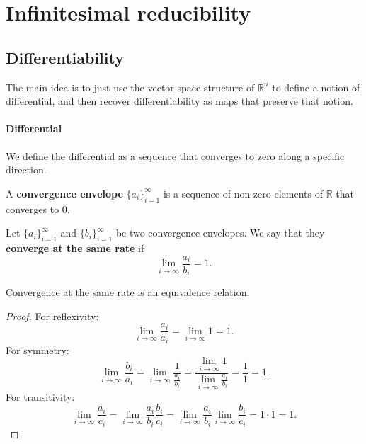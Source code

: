 \documentclass[11pt,letterpaper,fleqn]{memoir}
\begin{document}
	
\tableofcontents* 
	
\cleardoublepage 
\mainmatter

\chapter{Infinitesimal reducibility}

\section{Differentiability}

The main idea is to just use the vector space structure of $\mathbb{R}^n$ to define a notion of differential, and then recover differentiability as maps that preserve that notion.

\subsubsection{Differential}

We define the differential as a sequence that converges to zero along a specific direction.

\begin{defn}
	A \textbf{convergence envelope} $\{a_i\}_{i=1}^{\infty}$ is a sequence of non-zero elements of $\mathbb{R}$ that converges to $0$.
\end{defn}

\iffalse

\begin{defn}
	Let $\{a_i\}_{i=1}^{\infty}$ and $\{b_i\}_{i=1}^{\infty}$ be two convergence envelopes. We say that they \textbf{converge at the same rate} if 
	$$ \lim\limits_{i \to \infty} \frac{a_i}{b_i} = 1.$$
\end{defn}

\begin{prop}
	Convergence at the same rate is an equivalence relation.
\end{prop}

\begin{proof}
	For reflexivity:
	$$ \lim\limits_{i \to \infty} \frac{a_i}{a_i} = \lim\limits_{i \to \infty} 1 = 1.$$
	For symmetry:
	$$ \lim\limits_{i \to \infty} \frac{b_i}{a_i} = \lim\limits_{i \to \infty} \frac{1}{\frac{a_i}{b_i}} = \frac{ \lim\limits_{i \to \infty} 1}{\lim\limits_{i \to \infty} \frac{a_i}{b_i}} = \frac{1}{1} = 1.$$
	For transitivity:
	$$ \lim\limits_{i \to \infty} \frac{a_i}{c_i} = \lim\limits_{i \to \infty} \frac{a_i}{b_i}\frac{b_i}{c_i} = \lim\limits_{i \to \infty} \frac{a_i}{b_i} \lim\limits_{i \to \infty} \frac{b_i}{c_i} = 1 \cdot 1 = 1.$$
\end{proof}
\end{document}
